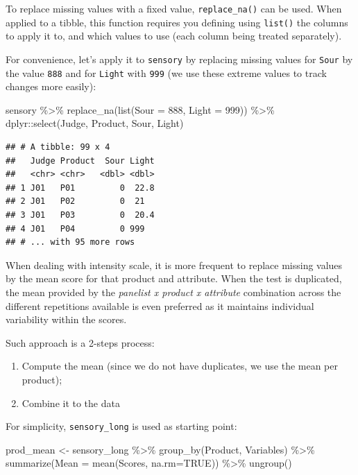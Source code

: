 \documentclass[
]{krantz}
\makeatletter
\newenvironment{Shaded}{\begin{snugshade}}{\end{snugshade}}
\newcommand{\AttributeTok}[1]{\textcolor[rgb]{0.61,0.61,0.61}{#1}}
\newcommand{\ConstantTok}[1]{\textcolor[rgb]{0,0,0}{#1}}
\newcommand{\DecValTok}[1]{\textcolor[rgb]{0.06,0.06,0.06}{#1}}
\newcommand{\FunctionTok}[1]{\textcolor[rgb]{0,0,0}{#1}}
\newcommand{\NormalTok}[1]{#1}
\newcommand{\OtherTok}[1]{\textcolor[rgb]{0.37,0.37,0.37}{#1}}
\newcommand{\SpecialCharTok}[1]{\textcolor[rgb]{0,0,0}{#1}}
\providecommand{\tightlist}{%
  \setlength{\itemsep}{0pt}\setlength{\parskip}{0pt}}
\newenvironment{kframe}{%
\medskip{}
\setlength{\fboxsep}{.8em}
 \def\at@end@of@kframe{}%
 \ifinner\ifhmode%
  \def\at@end@of@kframe{\end{minipage}}%
  \begin{minipage}{\columnwidth}%
 \fi\fi%
 \def\FrameCommand##1{\hskip\@totalleftmargin \hskip-\fboxsep
 \colorbox{shadecolor}{##1}\hskip-\fboxsep
     \hskip-\linewidth \hskip-\@totalleftmargin \hskip\columnwidth}%
 \MakeFramed {\advance\hsize-\width
   \@totalleftmargin\z@ \linewidth\hsize
   \@setminipage}}%
 {\par\unskip\endMakeFramed%
 \at@end@of@kframe}
\renewenvironment{Shaded}{\begin{kframe}}{\end{kframe}}
\makeatother
\begin{document}
To replace missing values with a fixed value, \texttt{replace\_na()} can be used. When applied to a tibble, this function requires you defining using \texttt{list()} the columns to apply it to, and which values to use (each column being treated separately).

For convenience, let's apply it to \texttt{sensory} by replacing missing values for \texttt{Sour} by the value \texttt{888} and for \texttt{Light} with \texttt{999} (we use these extreme values to track changes more easily):

\begin{Shaded}
\begin{Highlighting}[]
\NormalTok{sensory }\SpecialCharTok{\%\textgreater{}\%} 
  \FunctionTok{replace\_na}\NormalTok{(}\FunctionTok{list}\NormalTok{(}\AttributeTok{Sour =} \DecValTok{888}\NormalTok{, }\AttributeTok{Light =} \DecValTok{999}\NormalTok{)) }\SpecialCharTok{\%\textgreater{}\%} 
\NormalTok{  dplyr}\SpecialCharTok{::}\FunctionTok{select}\NormalTok{(Judge, Product, Sour, Light)}
\end{Highlighting}
\end{Shaded}

\begin{verbatim}
## # A tibble: 99 x 4
##   Judge Product  Sour Light
##   <chr> <chr>   <dbl> <dbl>
## 1 J01   P01         0  22.8
## 2 J01   P02         0  21  
## 3 J01   P03         0  20.4
## 4 J01   P04         0 999  
## # ... with 95 more rows
\end{verbatim}

When dealing with intensity scale, it is more frequent to replace missing values by the mean score for that product and attribute. When the test is duplicated, the mean provided by the \emph{panelist x product x attribute} combination across the different repetitions available is even preferred as it maintains individual variability within the scores.

Such approach is a 2-steps process:

\begin{enumerate}
\def\labelenumi{\arabic{enumi}.}
\tightlist
\item
  Compute the mean (since we do not have duplicates, we use the mean per product);
\item
  Combine it to the data
\end{enumerate}

For simplicity, \texttt{sensory\_long} is used as starting point:

\begin{Shaded}
\begin{Highlighting}[]
\NormalTok{prod\_mean }\OtherTok{\textless{}{-}}\NormalTok{ sensory\_long }\SpecialCharTok{\%\textgreater{}\%} 
  \FunctionTok{group\_by}\NormalTok{(Product, Variables) }\SpecialCharTok{\%\textgreater{}\%} 
  \FunctionTok{summarize}\NormalTok{(}\AttributeTok{Mean =} \FunctionTok{mean}\NormalTok{(Scores, }\AttributeTok{na.rm=}\ConstantTok{TRUE}\NormalTok{)) }\SpecialCharTok{\%\textgreater{}\%} 
  \FunctionTok{ungroup}\NormalTok{()}
\end{Highlighting}
\end{Shaded}
\end{document}

